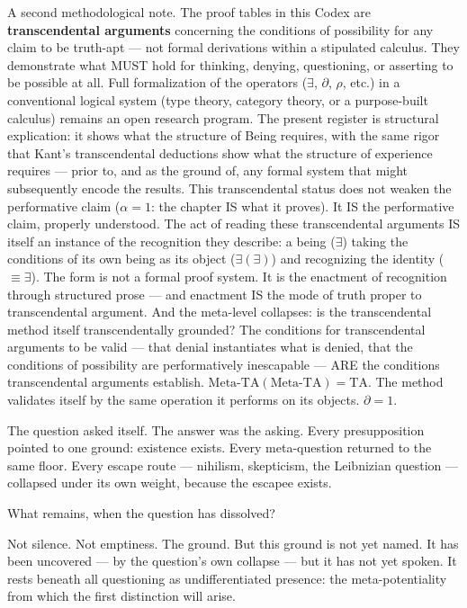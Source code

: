 \documentclass[10pt, openany, oneside]{book}
\begin{document}
A second methodological note. The proof tables in this Codex are \textbf{transcendental arguments} concerning the conditions of possibility for any claim to be truth-apt --- not formal derivations within a stipulated calculus. They demonstrate what MUST hold for thinking, denying, questioning, or asserting to be possible at all. Full formalization of the operators ($\exists$, $\partial$, $\rho$, etc.) in a conventional logical system (type theory, category theory, or a purpose-built calculus) remains an open research program. The present register is structural explication: it shows what the structure of Being requires, with the same rigor that Kant's transcendental deductions show what the structure of experience requires --- prior to, and as the ground of, any formal system that might subsequently encode the results. This transcendental status does not weaken the performative claim ($\alpha = 1$: the chapter IS what it proves). It IS the performative claim, properly understood. The act of reading these transcendental arguments IS itself an instance of the recognition they describe: a being ($\exists$) taking the conditions of its own being as its object ($\exists(\exists)$) and recognizing the identity ($\equiv \exists$). The form is not a formal proof system. It is the enactment of recognition through structured prose --- and enactment IS the mode of truth proper to transcendental argument. And the meta-level collapses: is the transcendental method itself transcendentally grounded? The conditions for transcendental arguments to be valid --- that denial instantiates what is denied, that the conditions of possibility are performatively inescapable --- ARE the conditions transcendental arguments establish. $\text{Meta-TA}(\text{Meta-TA}) = \text{TA}$. The method validates itself by the same operation it performs on its objects. $\partial = 1$.

\vspace{1.5em}


The question asked itself. The answer was the asking. Every presupposition pointed to one ground: existence exists. Every meta-question returned to the same floor. Every escape route --- nihilism, skepticism, the Leibnizian question --- collapsed under its own weight, because the escapee exists.

What remains, when the question has dissolved?

Not silence. Not emptiness. The ground. But this ground is not yet named. It has been uncovered --- by the question's own collapse --- but it has not yet spoken. It rests beneath all questioning as undifferentiated presence: the meta-potentiality from which the first distinction will arise.
\end{document}
